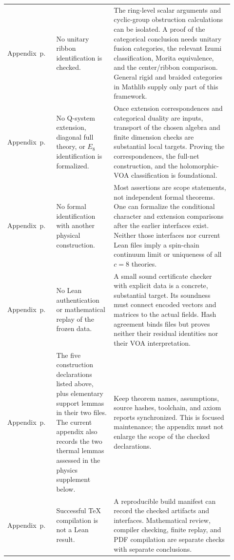 \begin{longtable}{@{}P{0.15\linewidth}P{0.25\linewidth}P{0.52\linewidth}@{}}
Appendix~\newline p.~
& No unitary ribbon identification is checked.
& The ring-level scalar arguments and cyclic-group obstruction
calculations can be isolated. A proof of the categorical conclusion
needs unitary fusion categories, the relevant Izumi classification,
Morita equivalence, and the center/ribbon comparison. General rigid
and braided categories in Mathlib supply only part of this framework.\\
Appendix~\newline p.~
& No Q-system extension, diagonal full theory, or $E_8$ identification
is formalized.
& Once extension correspondences and categorical duality are inputs,
transport of the chosen algebra and finite dimension checks are
substantial local targets. Proving the correspondences, the full-net
construction, and the holomorphic-VOA classification is foundational.\\
Appendix~\newline p.~
& No formal identification with another physical construction.
& Most assertions are scope statements, not independent formal
theorems. One can formalize the conditional character and extension
comparisons after the earlier interfaces exist. Neither those
interfaces nor current Lean files imply a spin-chain continuum limit
or uniqueness of all $c=8$ theories.\\
Appendix~\newline p.~
& No Lean authentication or mathematical replay of the frozen data.
& A small sound certificate checker with explicit data is a concrete,
substantial target. Its soundness must connect encoded vectors and
matrices to the actual fields. Hash agreement binds files but proves
neither their residual identities nor their VOA interpretation.\\
Appendix~\newline p.~
& The five construction declarations listed above, plus elementary
support lemmas in their two files. The current appendix also records
the two thermal lemmas assessed in the physics supplement below.
& Keep theorem names, assumptions, source hashes, toolchain, and axiom
reports synchronized. This is focused maintenance; the appendix must
not enlarge the scope of the checked declarations.\\
Appendix~\newline p.~
& Successful TeX compilation is not a Lean result.
& A reproducible build manifest can record the checked artifacts and
interfaces. Mathematical review, compiler checking, finite replay,
and PDF compilation are separate checks with separate conclusions.\\
\end{longtable}


